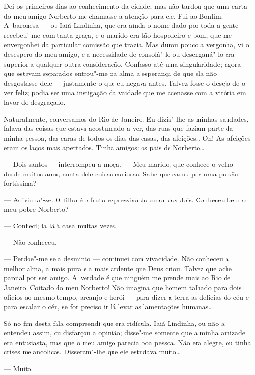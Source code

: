 \begin{linenumbers}
Dei os primeiros dias ao conhecimento da cidade; mas não tardou que uma
carta do meu amigo Norberto me chamasse a atenção para ele. Fui ao
Bonfim. A~baronesa --- ou Iaiá Lindinha, que era ainda o nome dado por
toda a gente --- recebeu"-me com tanta graça, e o marido era tão
hospedeiro e bom, que me envergonhei da particular comissão que trazia.
Mas durou pouco a vergonha, vi o desespero do meu amigo, e a necessidade
de consolá"-lo ou desenganá"-lo era superior a qualquer outra
consideração. Confesso até uma singularidade; agora que estavam
separados entrou"-me na alma a esperança de que ela não desgostasse dele
--- justamente o que eu negava antes. Talvez fosse o desejo de o ver
feliz; podia ser uma instigação da vaidade que me acenasse com a vitória
em favor do desgraçado.

Naturalmente, conversamos do Rio de Janeiro. Eu dizia"-lhe as minhas
saudades, falava das coisas que estava acostumado a ver, das ruas que
faziam parte da minha pessoa, das caras de todos os dias das casas, das
afeições\ldots{} Oh! As~afeições eram os laços mais apertados. Tinha amigos:
os pais de Norberto\ldots{}

--- Dois santos --- interrompeu a moça. --- Meu marido, que conhece o velho
desde muitos anos, conta dele coisas curiosas. Sabe que casou por uma
paixão fortíssima?

--- Adivinha"-se. O~filho é o fruto expressivo do amor dos dois. Conheceu
bem o meu pobre Norberto?

--- Conheci; ia lá à casa muitas vezes.

--- Não conheceu.

--- Perdoe"-me se a desminto --- continuei com vivacidade. Não conheceu a
melhor alma, a mais pura e a mais ardente que Deus criou. Talvez que
ache parcial por ser amigo. A~verdade é que ninguém me prende mais ao
Rio de Janeiro. Coitado do meu Norberto! Não imagina que homem talhado
para dois ofícios ao mesmo tempo, arcanjo e herói --- para dizer à terra
as delícias do céu e para escalar o céu, se for preciso ir lá levar as
lamentações humanas\ldots{}

Só no fim desta fala compreendi que era ridícula. Iaiá Lindinha, ou não
a entendeu assim, ou disfarçou a opinião; disse"-me somente que a minha
amizade era entusiasta, mas que o meu amigo parecia boa pessoa. Não era
alegre, ou tinha crises melancólicas. Disseram"-lhe que ele estudava
muito\ldots{}

--- Muito.


\end{linenumbers}
